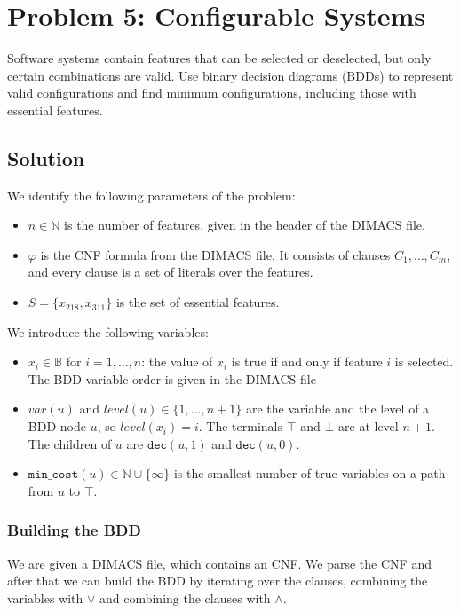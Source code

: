 \section{Problem 5: Configurable Systems}
Software systems contain features that can be selected or deselected, but only certain combinations are valid. Use binary decision diagrams (BDDs) to represent valid configurations and find minimum configurations, including those with essential features.


\begingroup
\newcommand\fn[2]{\mathtt{#1}(#2)}
\newcommand\hi[1]{\fn{dec}{#1, 1}}
\newcommand\lo[1]{\fn{dec}{#1, 0}}



\subsection{Solution}
We identify the following parameters of the problem:
\begin{itemize}
  \item $n \in \mathbb{N}$ is the number of features, given in the header of the DIMACS file.
  \item $\varphi$ is the CNF formula from the DIMACS file. It consists of clauses $C_1,\dots,C_m$, and every clause is a set of literals over the features.
  \item $S=\{x_{218},x_{311}\}$ is the set of essential features.
\end{itemize}
We introduce the following variables:
\begin{itemize}
  \item $x_i \in \mathbb{B}$ for $i=1,\dots,n$: the value of $x_i$ is true if and only if feature $i$ is selected. The BDD variable order is given in the DIMACS file
  \item $\mathit{var}(u)$ and $\mathit{level}(u)\in\{1,\dots,n+1\}$ are the variable and the level of a BDD node $u$, so $\mathit{level}(x_i)=i$. The terminals $\top$ and $\bot$ are at level $n+1$. The children of $u$ are $\hi{u}$ and $\lo{u}$.
  \item $\mathtt{min\_cost}(u)\in\mathbb{N}\cup\{\infty\}$ is the smallest number of true variables on a path from $u$ to $\top$.
\end{itemize}

\subsubsection{Building the BDD}
We are given a DIMACS file, which contains an CNF.
We parse the CNF and after that we can build the BDD by iterating over the clauses, combining the variables with $\vee$ and combining the clauses with $\wedge$. 

